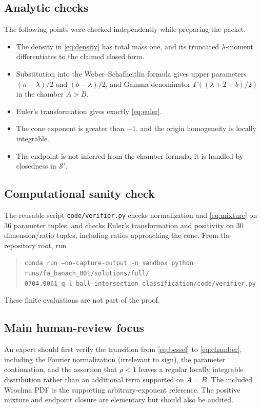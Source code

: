 \documentclass[11pt]{article}
\theoremstyle{remark}
\newcommand{\Sclass}{\mathcal S}
\begin{document}
\subsection*{Analytic checks}
The following points were checked independently while preparing the packet.
\begin{itemize}
\item The density in \eqref{eq:density} has total mass one, and its truncated
$\lambda$-moment differentiates to the claimed closed form.
\item Substitution into the Weber--Schafheitlin formula gives upper parameters
$(n-\lambda)/2$ and $(b-\lambda)/2$, and Gamma denominator
$\Gamma((\lambda+2-b)/2)$ in the chamber $A>B$.
\item Euler's transformation gives exactly \eqref{eq:euler}.
\item The cone exponent is greater than $-1$, and the origin homogeneity is
locally integrable.
\item The endpoint is not inferred from the chamber formula; it is handled by
closedness in $\Sclass'$.
\end{itemize}

\subsection*{Computational sanity check}
The reusable script \texttt{code/verifier.py} checks normalization and
\eqref{eq:mixture} on 36 parameter tuples, and checks Euler's transformation
and positivity on 30 dimension/ratio tuples, including ratios approaching
the cone.  From the repository root, run
\begin{quote}\small
\texttt{conda run --no-capture-output -n sandbox python}\\
\nolinkurl{runs/fa_banach_001/solutions/full/}\\
\nolinkurl{0704.0061_q_l_ball_intersection_classification/code/verifier.py}
\end{quote}
These finite evaluations are not part of the proof.

\subsection*{Main human-review focus}
An expert should first verify the transition from \eqref{eq:bessel} to
\eqref{eq:chamber}, including the Fourier normalization (irrelevant to sign),
the parameter continuation, and the assertion that $\rho<1$ leaves a regular
locally integrable distribution rather than an additional term supported on
$A=B$.  The included Wrochna PDF is the supporting arbitrary-exponent
reference.  The positive mixture and endpoint closure are elementary but
should also be audited.
\end{document}
